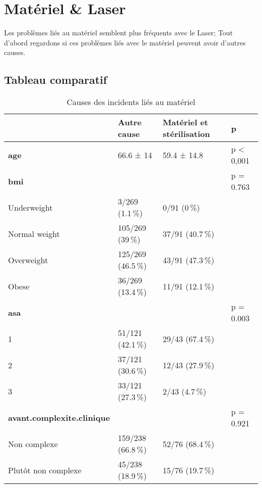 \documentclass[a4paper,fontsize=10pt,french]{scrartcl}
\begin{document}
\section{Matériel \& Laser}\label{matuxe9riel-laser}

Les problèmes liés au matériel semblent plus fréquents avec le Laser;
Tout d'abord regardons si ces problèmes liés avec le matériel peuvent
avoir d'autres causes.

\hypertarget{tableau-comparatif}{%
\subsection{Tableau comparatif}\label{tableau-comparatif}}

\begin{table}

\caption{\label{tab:tabcomp}Causes des incidents liés au matériel}
\centering
\begin{tabular}[t]{l|l|l|l}
  \toprule
  & Autre cause & Matériel et stérilisation & p\\
\midrule
\textbf{age} & 66.6 ± 14 & 59.4 ± 14.8 & p < 0,001\\
\midrule
\textbf{bmi} &  &  & p = 0.763\\
 
Underweight & 3/269 (1.1\,\%) & 0/91 (0\,\%) & \\
 
Normal weight & 105/269 (39\,\%) & 37/91 (40.7\,\%) & \\
 
Overweight & 125/269 (46.5\,\%) & 43/91 (47.3\,\%) & \\
 
Obese & 36/269 (13.4\,\%) & 11/91 (12.1\,\%) & \\
\midrule
\textbf{asa} &  &  & p = 0.003\\
 
1 & 51/121 (42.1\,\%) & 29/43 (67.4\,\%) & \\
 
2 & 37/121 (30.6\,\%) & 12/43 (27.9\,\%) & \\
 
3 & 33/121 (27.3\,\%) & 2/43 (4.7\,\%) & \\
\midrule
\textbf{avant.complexite.clinique} &  &  & p = 0.921\\
 
Non complexe & 159/238 (66.8\,\%) & 52/76 (68.4\,\%) & \\
 
Plutôt non complexe & 45/238 (18.9\,\%) & 15/76 (19.7\,\%) & \\
 

\end{tabular}
\end{table}
\end{document}
